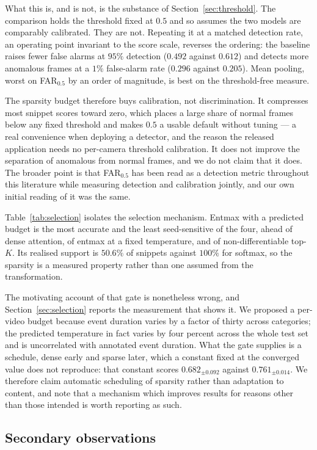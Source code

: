 \documentclass[11pt]{article}
\begin{document}
What this is, and is not, is the substance of Section~\ref{sec:threshold}. The
comparison holds the threshold fixed at $0.5$ and so assumes the two models are
comparably calibrated. They are not. Repeating it at a matched detection rate, an
operating point invariant to the score scale, reverses the ordering: the baseline
raises fewer false alarms at $95\%$ detection ($0.492$ against $0.612$) and
detects more anomalous frames at a $1\%$ false-alarm rate ($0.296$ against
$0.205$). Mean pooling, worst on FAR$_{0.5}$ by an order of magnitude, is best on
the threshold-free measure.

The sparsity budget therefore buys calibration, not discrimination. It compresses
most snippet scores toward zero, which places a large share of normal frames below
any fixed threshold and makes $0.5$ a usable default without tuning --- a real
convenience when deploying a detector, and the reason the released application
needs no per-camera threshold calibration. It does not improve the separation of
anomalous from normal frames, and we do not claim that it does. The broader point
is that FAR$_{0.5}$ has been read as a detection metric throughout this
literature while measuring detection and calibration jointly, and our own initial
reading of it was the same.

Table~\ref{tab:selection} isolates the selection mechanism. Entmax with a
predicted budget is the most accurate and the least seed-sensitive of the four,
ahead of dense attention, of entmax at a fixed temperature, and of
non-differentiable top-$K$. Its realised support is $50.6\%$ of snippets against
$100\%$ for softmax, so the sparsity is a measured property rather than one
assumed from the transformation.

The motivating account of that gate is nonetheless wrong, and
Section~\ref{sec:selection} reports the measurement that shows it. We proposed a
per-video budget because event duration varies by a factor of thirty across
categories; the predicted temperature in fact varies by four percent across the
whole test set and is uncorrelated with annotated event duration. What the gate
supplies is a schedule, dense early and sparse later, which a constant fixed at
the converged value does not reproduce: that constant scores $0.682_{\pm0.092}$
against $0.761_{\pm0.014}$. We therefore claim automatic scheduling of sparsity
rather than adaptation to content, and note that a mechanism which improves
results for reasons other than those intended is worth reporting as such.

\subsection{Secondary observations}
\end{document}
